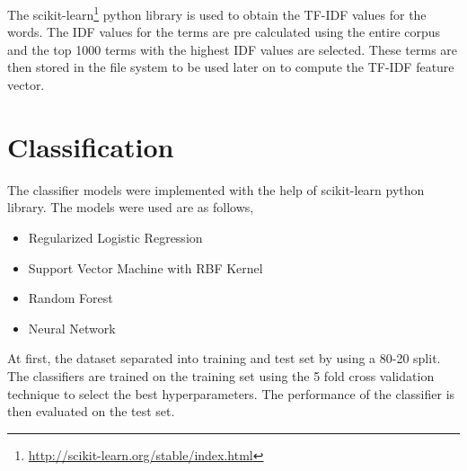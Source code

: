 The scikit-learn\footnote{\url{http://scikit-learn.org/stable/index.html}} python library is used to obtain the TF-IDF values for the words. The IDF values for the terms are pre calculated using the entire corpus and the top 1000 terms with the highest IDF values are selected. These terms are then stored in the file system to be used later on to compute the TF-IDF feature vector.

\section{Classification}
The classifier models were implemented with the help of scikit-learn python library. The models were used are as follows,

\begin{itemize}
    \item Regularized Logistic Regression
    \item Support Vector Machine with RBF Kernel
    \item Random Forest
    \item Neural Network
\end{itemize}


At first, the dataset separated into training and test set by using a 80-20 split. The classifiers are trained on the training set using the 5 fold cross validation technique to select the best hyperparameters. The performance of the classifier is then evaluated on the test set.
